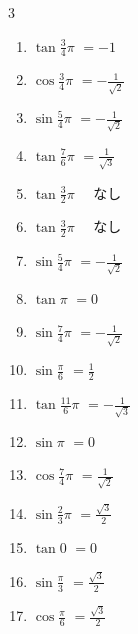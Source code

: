 \begin{multicols}{3}
\begin{enumerate}
  \item $\displaystyle \tan{\frac{3}{4}\pi}$
        $\displaystyle =-1$

  \item $\displaystyle \cos{\frac{3}{4}\pi}$
        $\displaystyle =-\frac{1}{\sqrt{2}}$

  \item $\displaystyle \sin{\frac{5}{4}\pi}$
        $\displaystyle =-\frac{1}{\sqrt{2}}$

  \item $\displaystyle \tan{\frac{7}{6}\pi}$
        $\displaystyle =\frac{1}{\sqrt{3}}$

  \item $\displaystyle \tan{\frac{3}{2}\pi}$
        $\displaystyle \quad なし$

  \item $\displaystyle \tan{\frac{3}{2}\pi}$
        $\displaystyle \quad なし$

  \item $\displaystyle \sin{\frac{5}{4}\pi}$
        $\displaystyle =-\frac{1}{\sqrt{2}}$

  \item $\displaystyle \tan{\pi}$
        $\displaystyle =0$

  \item $\displaystyle \sin{\frac{7}{4}\pi}$
        $\displaystyle =-\frac{1}{\sqrt{2}}$

  \item $\displaystyle \sin{\frac{\pi}{6}}$
        $\displaystyle =\frac{1}{2}$

  \item $\displaystyle \tan{\frac{11}{6}\pi}$
        $\displaystyle =-\frac{1}{\sqrt{3}}$

  \item $\displaystyle \sin{\pi}$
        $\displaystyle =0$

  \item $\displaystyle \cos{\frac{7}{4}\pi}$
        $\displaystyle =\frac{1}{\sqrt{2}}$

  \item $\displaystyle \sin{\frac{2}{3}\pi}$
        $\displaystyle =\frac{\sqrt{3}}{2}$

  \item $\displaystyle \tan{0}$
        $\displaystyle =0$

  \item $\displaystyle \sin{\frac{\pi}{3}}$
        $\displaystyle =\frac{\sqrt{3}}{2}$

  \item $\displaystyle \cos{\frac{\pi}{6}}$
        $\displaystyle =\frac{\sqrt{3}}{2}$


\end{enumerate}
\end{multicols}
